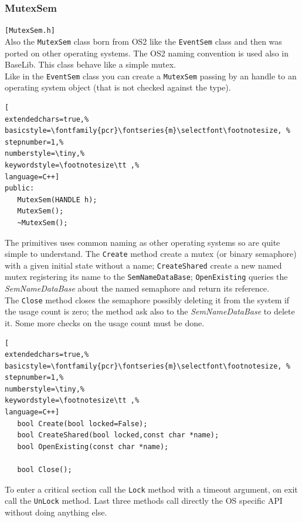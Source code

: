 \subsubsection{MutexSem}
\texttt{[MutexSem.h]}\\
Also the \texttt{MutexSem} class born from OS2 like the \texttt{EventSem} class and then was ported on other operating systems. The OS2 naming convention is used also in BaseLib. This class behave like a simple mutex. \\


Like in the \texttt{EventSem} class you can create a \texttt{MutexSem} passing by an handle to an operating system object (that is not checked against the type).

\begin{lstlisting}[
extendedchars=true,%
basicstyle=\fontfamily{pcr}\fontseries{m}\selectfont\footnotesize, %
stepnumber=1,%
numberstyle=\tiny,%
keywordstyle=\footnotesize\tt ,%
language=C++]
public:
   MutexSem(HANDLE h);
   MutexSem();
   ~MutexSem();
\end{lstlisting}

The primitives uses common naming as other operating systems so are quite simple to understand. The \texttt{Create} method create a mutex (or binary semaphore) with a given initial state without a name; \texttt{CreateShared} create a new named mutex registering its name to the \texttt{SemNameDataBase}; \texttt{OpenExisting} queries the \textit{SemNameDataBase} about the named semaphore and return its reference. \\


The \texttt{Close} method closes the semaphore possibly deleting it from the system if the usage count is zero; the method ask also to the \textit{SemNameDataBase} to delete it. Some more checks on the usage count must be done.

\begin{lstlisting}[
extendedchars=true,%
basicstyle=\fontfamily{pcr}\fontseries{m}\selectfont\footnotesize, %
stepnumber=1,%
numberstyle=\tiny,%
keywordstyle=\footnotesize\tt ,%
language=C++]
   bool Create(bool locked=False);
   bool CreateShared(bool locked,const char *name);
   bool OpenExisting(const char *name);

   bool Close();
\end{lstlisting}

To enter a critical section call the \texttt{Lock} method with a timeout argument, on exit call the \texttt{UnLock} method.
Last three methods call directly the OS specific API without doing anything else.

